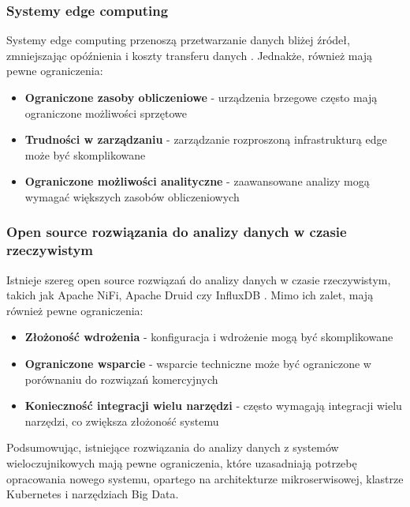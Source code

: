 \subsubsection{Systemy edge computing}
\label{subsubsec:edge_computing}

Systemy edge computing przenoszą przetwarzanie danych bliżej źródeł, zmniejszając opóźnienia i koszty transferu danych \citep{edge_computing}. Jednakże, również mają pewne ograniczenia:

\begin{itemize}
    \item \textbf{Ograniczone zasoby obliczeniowe} - urządzenia brzegowe często mają ograniczone możliwości sprzętowe
    \item \textbf{Trudności w zarządzaniu} - zarządzanie rozproszoną infrastrukturą edge może być skomplikowane
    \item \textbf{Ograniczone możliwości analityczne} - zaawansowane analizy mogą wymagać większych zasobów obliczeniowych
\end{itemize}

\subsubsection{Open source rozwiązania do analizy danych w czasie rzeczywistym}
\label{subsubsec:open_source}

Istnieje szereg open source rozwiązań do analizy danych w czasie rzeczywistym, takich jak Apache NiFi, Apache Druid czy InfluxDB \citep{open_source_realtime}. Mimo ich zalet, mają również pewne ograniczenia:

\begin{itemize}
    \item \textbf{Złożoność wdrożenia} - konfiguracja i wdrożenie mogą być skomplikowane
    \item \textbf{Ograniczone wsparcie} - wsparcie techniczne może być ograniczone w porównaniu do rozwiązań komercyjnych
    \item \textbf{Konieczność integracji wielu narzędzi} - często wymagają integracji wielu narzędzi, co zwiększa złożoność systemu
\end{itemize}

Podsumowując, istniejące rozwiązania do analizy danych z systemów wieloczujnikowych mają pewne ograniczenia, które uzasadniają potrzebę opracowania nowego systemu, opartego na architekturze mikroserwisowej, klastrze Kubernetes i narzędziach Big Data. 